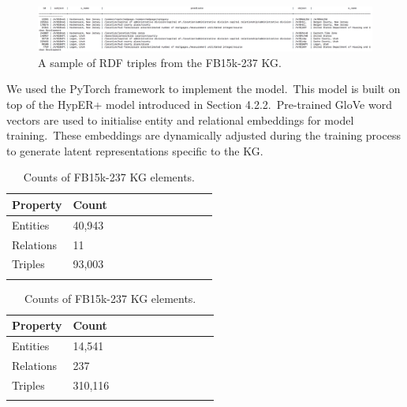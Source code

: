 \begin{figure}[H]
   	\centering
    	\includegraphics[width=1.0\textwidth, height=0.3\textwidth]{fb15k_237_fact_sample}
	\captionsetup{justification=centering}
	\caption{A sample of RDF triples from the FB15k-237 KG.}
\end{figure}

\noindent We used the PyTorch framework to implement the model.\ This model is built on top of the HypER+ model introduced in Section 4.2.2.\ Pre-trained GloVe word vectors are used to initialise entity and relational embeddings for model training.\ These embeddings are dynamically adjusted during the training process to generate latent representations specific to the KG. \par

\begin{table}[H]
	\parbox{.5\linewidth}{
		\centering
		\begin{tabular}{lllllllllll}
  			\textbf{Property} & \textbf{Count}  \\
  			\hline
  			Entities & 40,943  \\
  			Relations & 11  \\
  			Triples & 93,003 \\
			&
		\end{tabular}
		\captionsetup{justification=centering}
		\caption{Counts of WN18RR KG elements.}
		}
	\hfill
	\parbox{.5\linewidth}{
		\centering
		\begin{tabular}{lllllllllll}
  			\textbf{Property} & \textbf{Count}  \\
  			\hline
  			Entities & 14,541   \\
  			Relations & 237  \\
  			Triples & 310,116  \\
			&
		\end{tabular}
		\captionsetup{justification=centering}
		\caption{Counts of FB15k-237 KG elements.}
		}
\end{table}


